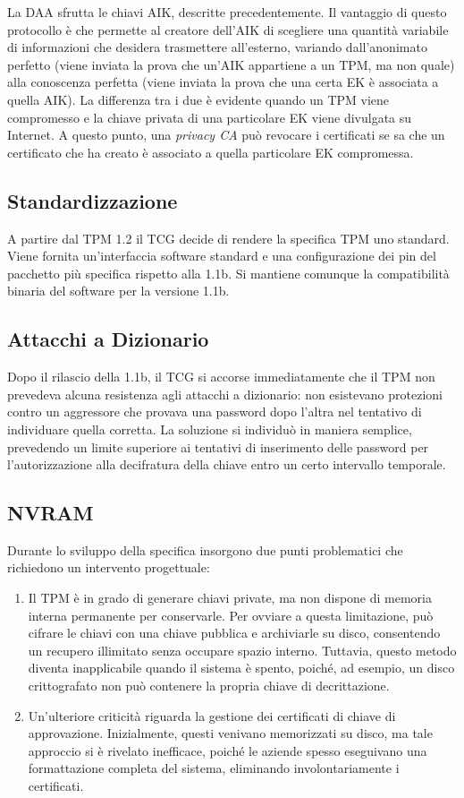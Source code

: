 La DAA sfrutta le chiavi AIK, descritte precedentemente. Il vantaggio di questo protocollo è che permette al creatore dell'AIK di scegliere una quantità variabile di informazioni che desidera trasmettere all’esterno, variando dall'anonimato perfetto (viene inviata la prova che un'AIK appartiene a un TPM, ma non quale) alla conoscenza perfetta (viene inviata la prova che una certa EK è associata a quella AIK). La differenza tra i due è evidente quando un TPM viene compromesso e la chiave privata di una particolare EK viene divulgata su Internet. A questo punto, una \textit{privacy CA} può revocare i certificati se sa che un certificato che ha creato è associato a quella particolare EK compromessa.

\subsection{Standardizzazione}
A partire dal TPM 1.2 il TCG decide di rendere la specifica TPM uno standard. Viene fornita un'interfaccia software standard e una configurazione dei pin del pacchetto più specifica rispetto alla 1.1b. Si mantiene comunque la compatibilità binaria del software per la versione 1.1b. 

\subsection{Attacchi a Dizionario}
Dopo il rilascio della 1.1b, il TCG si accorse immediatamente che il TPM non prevedeva alcuna resistenza agli attacchi a dizionario: non esistevano protezioni contro un aggressore che provava una password dopo l'altra nel tentativo di individuare quella corretta. La soluzione si individuò in maniera semplice, prevedendo un limite superiore ai tentativi di inserimento delle password per l’autorizzazione alla decifratura della chiave entro un certo intervallo temporale.

\subsection{NVRAM}
Durante lo sviluppo della specifica insorgono due punti problematici che richiedono un intervento progettuale:
\begin{enumerate}
    \item Il TPM è in grado di generare chiavi private, ma non dispone di memoria interna permanente per conservarle. Per ovviare a questa limitazione, può cifrare le chiavi con una chiave pubblica e archiviarle su disco, consentendo un recupero illimitato senza occupare spazio interno. Tuttavia, questo metodo diventa inapplicabile quando il sistema è spento, poiché, ad esempio, un disco crittografato non può contenere la propria chiave di decrittazione.
    \item Un'ulteriore criticità riguarda la gestione dei certificati di chiave di approvazione. Inizialmente, questi venivano memorizzati su disco, ma tale approccio si è rivelato inefficace, poiché le aziende spesso eseguivano una formattazione completa del sistema, eliminando involontariamente i certificati.
\end{enumerate}

